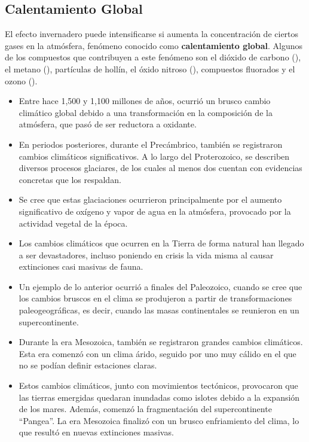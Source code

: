 \subsection{Calentamiento Global}
El efecto invernadero puede intensificarse si aumenta la concentración de ciertos gases en la atmósfera, fenómeno conocido como \textbf{calentamiento global}. Algunos de los compuestos que contribuyen a este fenómeno son el dióxido de carbono (), el metano (), partículas de hollín, el óxido nitroso (), compuestos fluorados y el ozono ().
\begin{itemize}
\item Entre hace 1,500 y 1,100 millones de años, ocurrió un brusco cambio climático global debido a una transformación en la composición de la atmósfera, que pasó de ser reductora a oxidante.
\item En periodos posteriores, durante el Precámbrico, también se registraron cambios climáticos significativos. A lo largo del Proterozoico, se describen diversos procesos glaciares, de los cuales al menos dos cuentan con evidencias concretas que los respaldan.
\item Se cree que estas glaciaciones ocurrieron principalmente por el aumento significativo de oxígeno y vapor de agua en la atmósfera, provocado por la actividad vegetal de la época.
\item Los cambios climáticos que ocurren en la Tierra de forma natural han llegado a ser devastadores, incluso poniendo en crisis la vida misma al causar extinciones casi masivas de fauna.
\item Un ejemplo de lo anterior ocurrió a finales del Paleozoico, cuando se cree que los cambios bruscos en el clima se produjeron a partir de transformaciones paleogeográficas, es decir, cuando las masas continentales se reunieron en un supercontinente.
\item Durante la era Mesozoica, también se registraron grandes cambios climáticos. Esta era comenzó con un clima árido, seguido por uno muy cálido en el que no se podían definir estaciones claras.
\item Estos cambios climáticos, junto con movimientos tectónicos, provocaron que las tierras emergidas quedaran inundadas como islotes debido a la expansión de los mares. Además, comenzó la fragmentación del supercontinente ``Pangea''. La era Mesozoica finalizó con un brusco enfriamiento del clima, lo que resultó en nuevas extinciones masivas.
\end{itemize}

